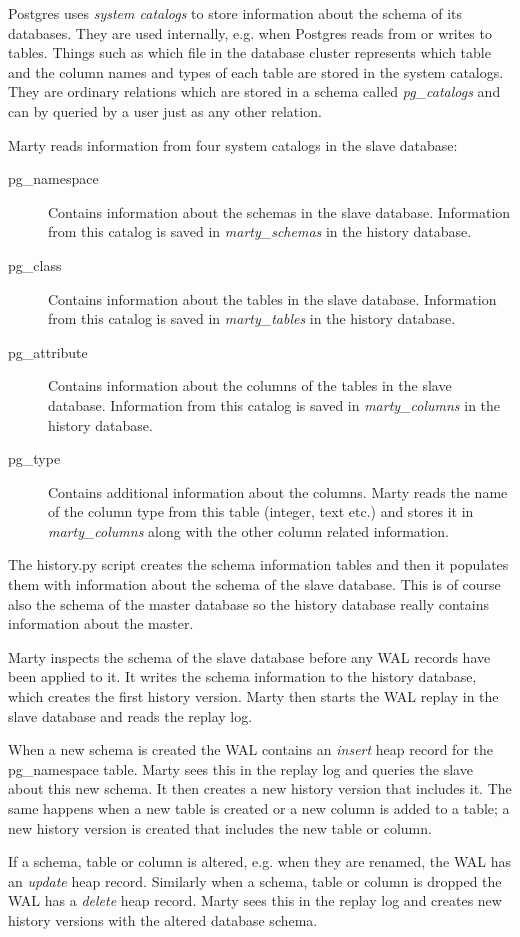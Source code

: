 Postgres uses \textit{system catalogs} to store information about the schema of its databases.
They are used internally, e.g. when Postgres reads from or writes to tables.
Things such as which file in the database cluster represents which table and the column names and types of each table are stored in the system catalogs. %
They are ordinary relations which are stored in a schema called \textit{pg\_catalogs} and can by queried by a user just as any other relation.

Marty reads information from four system catalogs in the slave database:

\begin{description}
  \item[pg\_namespace]
    Contains information about the schemas in the slave database.
    Information from this catalog is saved in \textit{marty\_schemas} in the history database. %
  \item[pg\_class]
    Contains information about the tables in the slave database.
    Information from this catalog is saved in \textit{marty\_tables} in the history database.
  \item[pg\_attribute]
    Contains information about the columns of the tables in the slave database.
    Information from this catalog is saved in \textit{marty\_columns} in the history database.
  \item[pg\_type]
    Contains additional information about the columns.
    Marty reads the name of the column type from this table (integer, text etc.) and stores it in \textit{marty\_columns} along with the other column related information.
\end{description}

The history.py script creates the schema information tables and then it populates them with information about the schema of the slave database.
This is of course also the schema of the master database so the history database really contains information about the master.

Marty inspects the schema of the slave database before any WAL records have been applied to it.
It writes the schema information to the history database, which creates the first history version.
Marty then starts the WAL replay in the slave database and reads the replay log.

When a new schema is created the WAL contains an \textit{insert} heap record for the pg\_namespace table.
Marty sees this in the replay log and queries the slave about this new schema.
It then creates a new history version that includes it.
The same happens when a new table is created or a new column is added to a table; a new history version is created that includes the new table or column.

If a schema, table or column is altered, e.g. when they are renamed, the WAL has an \textit{update} heap record.
Similarly when a schema, table or column is dropped the WAL has a \textit{delete} heap record.
Marty sees this in the replay log and creates new history versions with the altered database schema.

